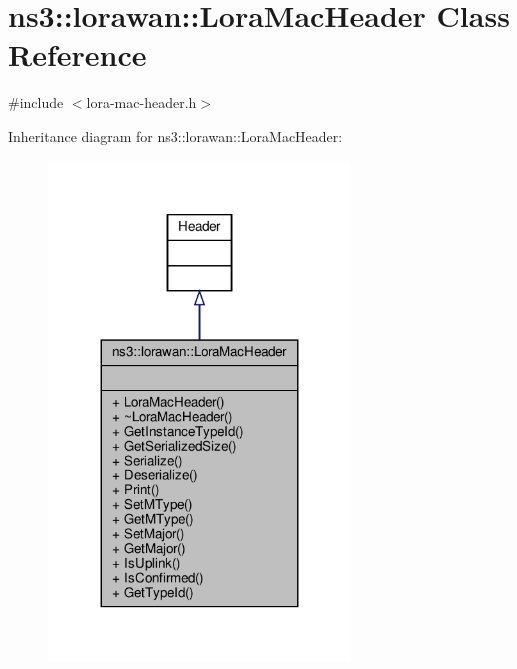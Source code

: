 \hypertarget{classns3_1_1lorawan_1_1LoraMacHeader}{}\section{ns3\+:\+:lorawan\+:\+:Lora\+Mac\+Header Class Reference}
\label{classns3_1_1lorawan_1_1LoraMacHeader}


{\ttfamily \#include $<$lora-\/mac-\/header.\+h$>$}



Inheritance diagram for ns3\+:\+:lorawan\+:\+:Lora\+Mac\+Header\+:
\nopagebreak
\begin{figure}[H]
\begin{center}
\leavevmode
\includegraphics[width=227pt]{classns3_1_1lorawan_1_1LoraMacHeader__inherit__graph}
\end{center}
\end{figure}


